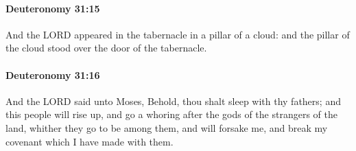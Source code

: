 		\paragraph{Deuteronomy 31:15} %
			\label{DEUTERONOMY-31-15}

			And the LORD appeared in the tabernacle in a pillar of a cloud: and the pillar of the cloud stood over the door of the tabernacle.


		\paragraph{Deuteronomy 31:16} %
			\label{DEUTERONOMY-31-16}

			And the LORD said unto Moses, Behold, thou shalt sleep with thy fathers; and this people will rise up, and go a whoring after the gods of the strangers of the land, whither they go to be among them, and will forsake me, and break my covenant which I have made with them.

